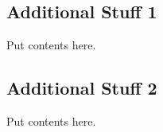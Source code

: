 
\subsection{Additional Stuff 1}
Put contents here.

\subsection{Additional Stuff 2}
Put contents here.